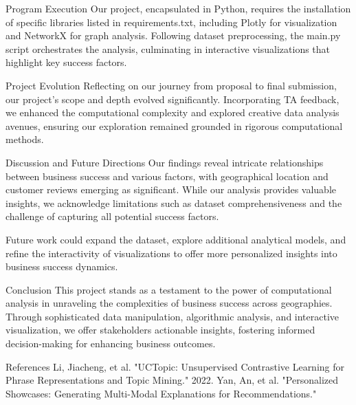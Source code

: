Program Execution
Our project, encapsulated in Python, requires the installation of specific libraries listed in requirements.txt,
including Plotly for visualization and NetworkX for graph analysis. Following dataset preprocessing, the main.py
script orchestrates the analysis, culminating in interactive visualizations that highlight key success factors.

Project Evolution
Reflecting on our journey from proposal to final submission, our project's scope and depth evolved significantly.
Incorporating TA feedback, we enhanced the computational complexity and explored creative data analysis avenues,
ensuring our exploration remained grounded in rigorous computational methods.

Discussion and Future Directions
Our findings reveal intricate relationships between business success and various factors, with geographical location
and customer reviews emerging as significant. While our analysis provides valuable insights, we acknowledge limitations
such as dataset comprehensiveness and the challenge of capturing all potential success factors.

Future work could expand the dataset, explore additional analytical models, and refine the interactivity of
visualizations to offer more personalized insights into business success dynamics.

Conclusion
This project stands as a testament to the power of computational analysis in unraveling the complexities of business
success across geographies. Through sophisticated data manipulation, algorithmic analysis, and interactive
visualization, we offer stakeholders actionable insights, fostering informed decision-making for enhancing
business outcomes.

References
Li, Jiacheng, et al. "UCTopic: Unsupervised Contrastive Learning for Phrase Representations and Topic Mining." 2022.
Yan, An, et al. "Personalized Showcases: Generating Multi-Modal Explanations for Recommendations."
